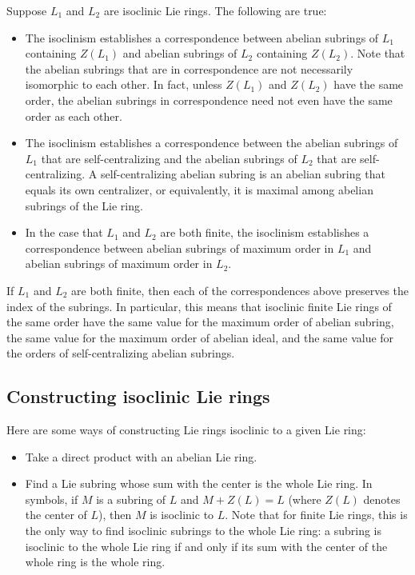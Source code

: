 Suppose $L_1$ and $L_2$ are isoclinic Lie rings. The following are true:

\begin{itemize}
\item The isoclinism establishes a correspondence between abelian
  subrings of $L_1$ containing $Z(L_1)$ and abelian subrings of $L_2$
  containing $Z(L_2)$. Note that the abelian subrings that are in
  correspondence are not necessarily isomorphic to each other. In
  fact, unless $Z(L_1)$ and $Z(L_2)$ have the same order, the abelian
  subrings in correspondence need not even have the same order as
  each other.
\item The isoclinism establishes a correspondence between the abelian
  subrings of $L_1$ that are self-centralizing and the abelian
  subrings of $L_2$ that are self-centralizing. A self-centralizing
  abelian subring is an abelian subring that equals its own
  centralizer, or equivalently, it is maximal among abelian subrings
  of the Lie ring.
\item In the case that $L_1$ and $L_2$ are both finite, the isoclinism
  establishes a correspondence between abelian subrings of maximum
  order in $L_1$ and abelian subrings of maximum order in
  $L_2$.
\end{itemize}

If $L_1$ and $L_2$ are both finite, then each of the correspondences
above preserves the index of the subrings. In particular, this means
that isoclinic finite Lie rings of the same order have the same value
for the maximum order of abelian subring, the same value for the
maximum order of abelian ideal, and the same value for the orders of
self-centralizing abelian subrings.

\subsection{Constructing isoclinic Lie rings}

Here are some ways of constructing Lie rings isoclinic to a given Lie ring:

\begin{itemize}
\item Take a direct product with an abelian Lie ring.
\item Find a Lie subring whose sum with the center is the whole Lie
  ring. In symbols, if $M$ is a subring of $L$ and $M + Z(L) = L$
  (where $Z(L)$ denotes the center of $L$), then $M$ is isoclinic to
  $L$. Note that for finite Lie rings, this is the only way to find
  isoclinic subrings to the whole Lie ring: a subring is isoclinic to
  the whole Lie ring if and only if its sum with the center of the
  whole ring is the whole ring.
\end{itemize}
